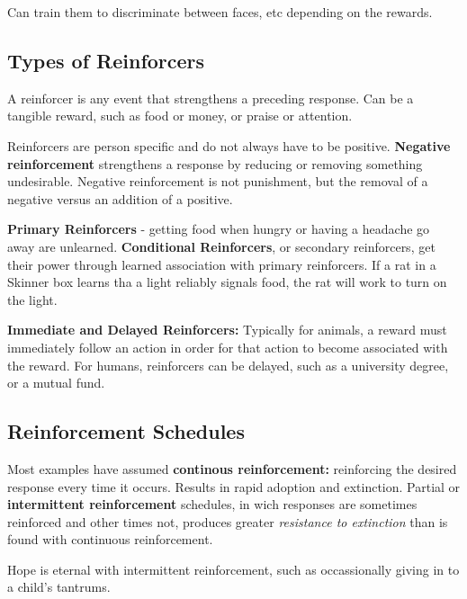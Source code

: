 \documentclass[12pt]{article}
\begin{document}
Can train them to discriminate between faces, etc depending on the rewards.

\subsection*{Types of Reinforcers}
A reinforcer is any event that strengthens a preceding response. Can be a tangible reward, such as food or money, or praise or attention. 

Reinforcers are person specific and do not always have to be positive. \textbf{Negative reinforcement} strengthens a response by reducing or removing something undesirable. Negative reinforcement is not punishment, but the removal of a negative versus an addition of a positive. 

\textbf{Primary Reinforcers} - getting food when hungry or having a headache go away are unlearned. \textbf{Conditional Reinforcers}, or secondary reinforcers, get their power through learned association with primary reinforcers. If a rat in a Skinner box learns tha a light reliably signals food, the rat will work to turn on the light.

\textbf{Immediate and Delayed Reinforcers:} Typically for animals, a reward must immediately follow an action in order for that action to become associated with the reward. For humans, reinforcers can be delayed, such as a university degree, or a mutual fund.

\subsection*{Reinforcement Schedules}
Most examples have assumed \textbf{continous reinforcement:} reinforcing the desired response every time it occurs. Results in rapid adoption and extinction. Partial or \textbf{intermittent reinforcement} schedules, in wich responses are sometimes reinforced and other times not, produces greater \textit{resistance to extinction} than is found with continuous reinforcement.

Hope is eternal with intermittent reinforcement, such as occassionally giving in to a child's tantrums. 
\end{document}
